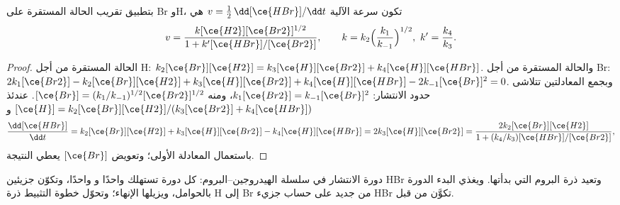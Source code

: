 \begin{theorem}\label{thm:b3:complex-kinetics:hbr}
بتطبيق تقريب الحالة المستقرة على Br وH، تكون سرعة الآلية $v = \frac12\,\dd[\ce{HBr}]/\dd t$
هي
\[
  v = \frac{k[\ce{H2}][\ce{Br2}]^{1/2}}{1 + k'[\ce{HBr}]/[\ce{Br2}]},
  \qquad k = k_2\Bigl(\frac{k_1}{k_{-1}}\Bigr)^{1/2},\ k' = \frac{k_4}{k_3}.
\]
\end{theorem}

\begin{proof}
الحالة المستقرة من أجل H: $k_2[\ce{Br}][\ce{H2}] = k_3[\ce{H}][\ce{Br2}] + k_4[\ce{H}][\ce{HBr}]$. والحالة المستقرة من أجل Br:
$2k_1[\ce{Br2}] - k_2[\ce{Br}][\ce{H2}] + k_3[\ce{H}][\ce{Br2}] + k_4[\ce{H}][\ce{HBr}] - 2k_{-1}[\ce{Br}]^2 = 0$. وبجمع
المعادلتين تتلاشى حدود الانتشار: $k_1[\ce{Br2}] = k_{-1}[\ce{Br}]^2$، ومنه $[\ce{Br}] =
(k_1/k_{-1})^{1/2}[\ce{Br2}]^{1/2}$. عندئذ $[\ce{H}] = k_2[\ce{Br}][\ce{H2}]/(k_3[\ce{Br2}] + k_4[\ce{HBr}])$ و
\[
  \frac{\dd[\ce{HBr}]}{\dd t} = k_2[\ce{Br}][\ce{H2}] + k_3[\ce{H}][\ce{Br2}] - k_4[\ce{H}][\ce{HBr}] = 2k_3[\ce{H}][\ce{Br2}]
  = \frac{2k_2[\ce{Br}][\ce{H2}]}{1 + (k_4/k_3)[\ce{HBr}]/[\ce{Br2}]},
\]
باستعمال المعادلة الأولى؛ وتعويض $[\ce{Br}]$ يعطي النتيجة.
\end{proof}

\begin{omfigure}

{\small دورة الانتشار في سلسلة الهيدروجين--البروم: كل دورة تستهلك
 واحدًا و واحدًا، وتكوّن جزيئين HBr وتعيد ذرة البروم التي
بدأتها. ويغذي البدء الدورة بالحوامل، ويزيلها الإنهاء؛
وتحوّل خطوة التثبيط ذرة H إلى Br من جديد على حساب جزيء HBr
تكوَّن من قبل.}
\end{omfigure}

